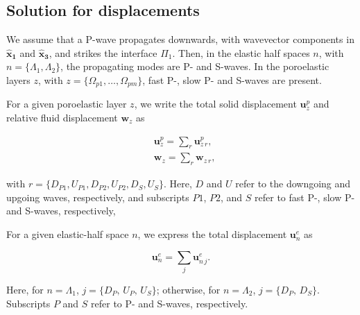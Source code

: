 \documentclass[draft]{agujournal2019}
\begin{document}
\subsection{Solution for displacements}
We assume that a P-wave propagates downwards, with wavevector components in $\bm{\hat x_1}$ and  $\bm{\hat x_3}$, and strikes the interface $\Pi_1$.  Then, in the elastic half spaces $n$, with $n =\{\Lambda_1,\Lambda_2\}$, the propagating modes  are P- and S-waves. In the poroelastic layers $z$, with $z=\{\Omega_{p1},\dots,\Omega_{pm}\}$, fast P-, slow P- and S-waves are present.

For a given poroelastic layer $z$, we write the total solid displacement $\bm{u}_z^p$  and relative fluid displacement $\bm{w}_z$ as
\begin{linenomath*}
\begin{equation}\label{Eq.a7}
\begin{split}
& \bm{u}_z^{p} =  \sum_r \bm{u}_{z\,r}^p, \\
& \bm{w}_z =  \sum_r \bm{w}_{z\,r},
\end{split}
\end{equation}
\end{linenomath*}
with $r=\{D_{P1},U_{P1},D_{P2},U_{P2},D_{S},U_{S}\}$. Here, $D$ and $U$ refer to the downgoing and upgoing waves, respectively, and subscripts $P1$, $P2$, and $S$ refer to fast P-, slow P- and S-waves, respectively,

For a given elastic-half space $n$,  we express the total displacement $\bm{u}_n^e$ as
\begin{linenomath*}
\begin{equation}\label{Eq.a8}
\bm{u}_n^{e} =  \sum_j \bm{u}_{n\,j}^e.
\end{equation}
\end{linenomath*}
Here, for $n =\Lambda_1 $,  $j=\{D_P,\,U_P,\,U_S\}$; otherwise, for $n =\Lambda_2 $, $j=\{D_P,\,D_S\}$. Subscripts $P$  and $S$ refer to P- and S-waves, respectively. 
\end{document}
